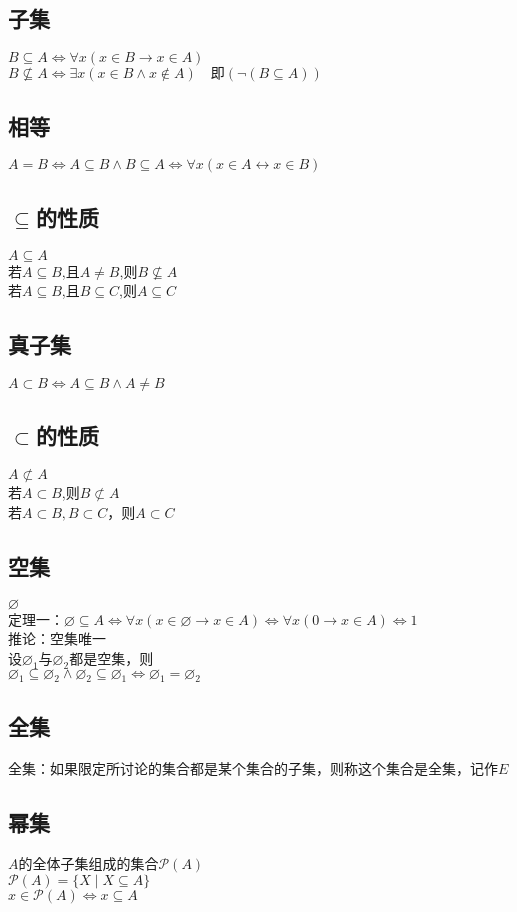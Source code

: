 \documentclass{book}
\newcommand{\Eqv}{\Leftrightarrow}
\newcommand{\eqv}{\leftrightarrow}
\newcommand{\A}{\forall}
\newcommand{\E}{\exists}
\newcommand{\no}{\varnothing}
\newcommand{\scr}[1]{\mathscr{#1}}
\newcommand{\nsubset}{\not\subset}
\begin{document}
\subsection{子集}
\noindent
$B\subseteq A\Eqv \A x(x\in B\to x\in A)$\\
$B\nsubseteq A\Eqv \E x(x\in B\land x\notin A)\quad \mbox{即}(\neg(B\subseteq A))$
\subsection{相等}
$A=B\Eqv A\subseteq B\land B\subseteq A\Eqv \A x(x\in A\eqv x\in B)$
\subsection{$\subseteq$的性质}
\noindent
$A\subseteq A$\\
若$A\subseteq B$,且$A\neq B$,则$B\nsubseteq A$\\
若$A\subseteq B$,且$B\subseteq C$,则$A\subseteq C$
\subsection{真子集}
$A\subset B\Eqv A\subseteq B\land A\neq B$
\subsection{$\subset$的性质}
\noindent
$A\nsubset A$\\
若$A\subset B$,则$B\nsubset A$\\
若$A\subset B, B\subset C$，则$A\subset C$
\subsection{空集}
$\no$\\
定理一：$\no\subseteq A\Eqv \A x(x\in\no\to x\in A)\Eqv\A x(0\to x\in A)\Eqv 1$\\
推论：空集唯一\\
设$\no_1$与$\no_2$都是空集，则\\
$\no_1\subseteq\no_2\land\no_2\subseteq\no_1\Eqv\no_1=\no_2$
\subsection{全集}
全集：如果限定所讨论的集合都是某个集合的子集，则称这个集合是全集，记作$E$
\subsection{幂集}
$A$的全体子集组成的集合$\scr{P}(A)$\\
$\scr{P}(A)=\{X\mid X\subseteq A\}$\\
$x\in\scr{P}(A)\Eqv x\subseteq A$
\end{document}
